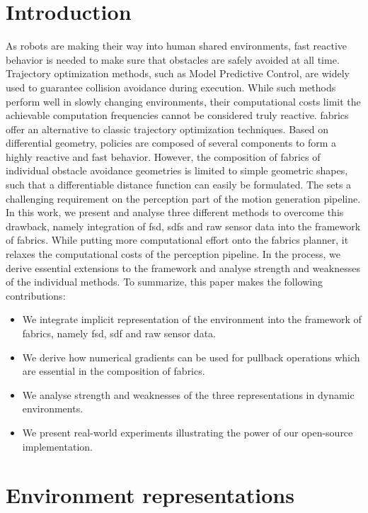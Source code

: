 \section{Introduction}
\label{sec:intro}


As robots are making their way into human shared environments,
fast reactive behavior is needed to make sure that obstacles are safely avoided
at all time. Trajectory optimization methods, such as Model Predictive Control,
are widely used to guarantee collision avoidance during execution. While such
methods perform well in slowly changing environments, their computational costs
limit the achievable computation frequencies cannot be considered truly reactive. 
\ac{fabrics} offer an
alternative to classic trajectory optimization techniques. Based on differential
geometry, policies are composed of several components to form a highly reactive
and fast behavior. However, the composition of \ac{fabrics} of
individual obstacle avoidance geometries is limited to simple geometric shapes,
such that a differentiable distance function can easily be formulated. The 
sets a challenging requirement on the perception part of the motion generation
pipeline. In this work, we present and analyse three different methods to 
overcome this drawback, namely integration of \ac{fsd}, 
\acp{sdf} and raw sensor data into the framework of
\ac{fabrics}. While putting more computational effort onto the fabrics planner, it
relaxes the computational costs of the perception pipeline.
In the process, we derive essential extensions to the framework and
analyse strength and weaknesses of the individual methods. To summarize, this
paper makes the following contributions:
\begin{itemize}
  \item We integrate implicit representation of the environment into the
    framework of \ac{fabrics}, namely \ac{fsd}, \ac{sdf}
    and raw sensor data.
  \item We derive how numerical gradients can be used for pullback operations
    which are essential in the composition of \ac{fabrics}.
  \item We analyse strength and weaknesses of the three representations in
    dynamic environments.
  \item We present real-world experiments illustrating the power of our
    open-source implementation.
\end{itemize}

\section{Environment representations}
\label{sec:environment_representations}

